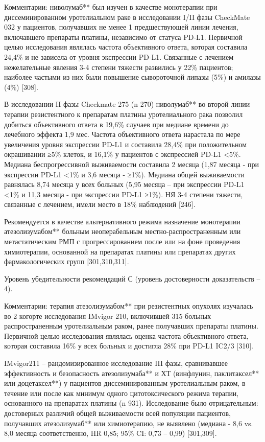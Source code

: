 Комментарии: ниволумаб** был изучен в качестве монотерапии при диссеминированном уротелиальном раке в исследовании I/II фазы CheckMate 032 у пациентов, получавших не менее 1 предшествующей линии лечения, включавшего препараты платины, независимо от статуса PD-L1. Первичной целью исследования являлась частота объективного ответа, которая составила 24,4\% и не зависела от уровня экспрессии PD-L1. Связанные с лечением нежелательные явления 3-4 степени тяжести развились у 22\% пациентов; наиболее частыми из них были повышение сывороточной липазы (5\%) и амилазы (4\%) [308].

В исследовании II фазы Checkmate 275 (n 270) ниволумаб** во второй линии терапии резистентного к препаратам платины уротелиального рака позволил добиться объективного ответа в 19,6\% случаев при медиане времени до лечебного эффекта 1,9 мес. Частота объективного ответа нарастала по мере увеличения уровня экспрессии PD-L1 и составила 28,4\% при положительном окрашивании ≥5\% клеток, и 16,1\% у пациентов с экспрессией PD-L1 <5\%. Медиана беспрогрессивной выживаемости составила 2 месяца (1,87 месяца - при экспрессии PD-L1 <1\% и 3,6 месяца - ≥1\%). Медиана общей выживаемости равнялась 8,74 месяца у всех больных (5,95 месяца – при экспрессии PD-L1 <1\% и 11,3 месяца - при экспрессии PD-L1 ≥1\%). НЯ 3-4 степени тяжести, связанные с лечением, имели место в 18\% наблюдений [246].

Рекомендуется в качестве альтернативного режима назначение монотерапии атезолизумабом** больным неоперабельным местно-распространенным или метастатическим РМП с прогрессированием после или на фоне проведения химиотерапии, основанной на препаратах платины или препаратах других фармакологических групп [301,310,311].

Уровень убедительности рекомендаций С (уровень достоверности доказательств – 4).

Комментарии: терапия атезолизумабом** при резистентных опухолях изучалась во 2 когорте исследования IMvigor 210, включившей 315 больных распространенным уротелиальным раком, ранее получавших препараты платины. Первичной целью исследования являлась оценка частота объективного ответа, которая составила 16\% у всех больных и достигла 28\% при PD-L1 IC2/3 [310].

IMvigor211 – рандомизированное исследование III фазы, сравнивавшее эффективность и безопасность атезолизумаба** и ХТ (винфлунин, паклитаксел** или доцетаксел**) у пациентов диссеминированным уротелиальным раком, в течение или после как минимум одного цитотоксического режима терапии, основанного на препаратах платины (n 931). Исследование было отрицательным: достоверных различий общей выживаемости всей популяции пациентов, получавших атезолизумаб** или химиотерапию, не выявлено (медиана - 8,6 vs. 8,0 месяца соответственно, HR 0,85; 95\% CI: 0,73 – 0,99) [301,309].

